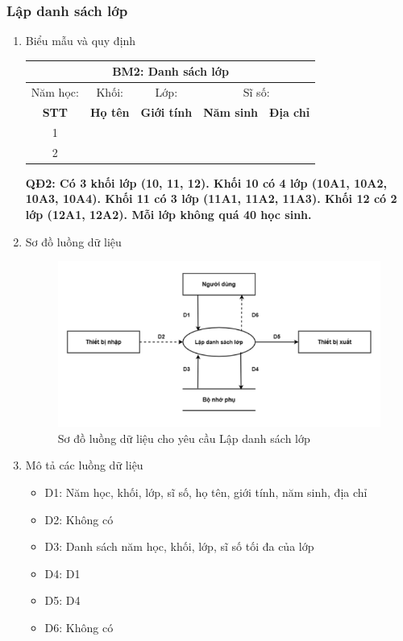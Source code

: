 \documentclass[a4paper]{article}
\begin{document}
	\subsubsection{Lập danh sách lớp}
\begin{enumerate}[label=\alph*.]
\item Biểu mẫu và quy định

\begin{table}[H]
	\centering
	 \renewcommand{\arraystretch}{1.5}
	   \setlength{\tabcolsep}{20pt}
	 \begin{tabular}{|c|c|c|c|c|}
	 \hline
	 \multicolumn{5}{|c|}{\textbf{BM2: Danh sách lớp}} \\
	 \hline
	 Năm học:  & Khối:  & Lớp:  & \multicolumn{2}{|c|}{Sĩ số: \dotfill}\\
	 \hline
	 \textbf{STT} & \textbf{Họ tên} & \textbf{Giới tính} & \textbf{Năm sinh} & \textbf{Địa chỉ}\\
	 \hline
	 1 & & & &\\
	 \hline
	 2 & & & & \\
	 \hline
	 \end{tabular}
	\end{table}
\textbf{QĐ2: Có 3 khối lớp (10, 11, 12). Khối 10 có 4 lớp (10A1, 10A2, 10A3, 10A4). Khối 11 có 3 lớp (11A1, 11A2, 11A3). Khối 12 có 2 lớp (12A1, 12A2). Mỗi lớp không quá 40 học sinh.}	
\item Sơ đồ luồng dữ liệu
\begin{figure}[H] 
    \centering
    \includegraphics[width=1\textwidth]{dfd2} %
    \caption{Sơ đồ luồng dữ liệu cho yêu cầu Lập danh sách lớp }
    \label{fig:example} %
\end{figure}	

\item Mô tả các luồng dữ liệu
\begin{itemize}
\item D1: Năm học, khối, lớp, sĩ số, họ tên, giới tính, năm sinh, địa chỉ
\item D2: Không có
\item D3: Danh sách năm học, khối, lớp, sĩ số tối đa của lớp
\item D4: D1
\item D5: D4
\item D6: Không có


\end{itemize}
\end{enumerate}
\end{document}
